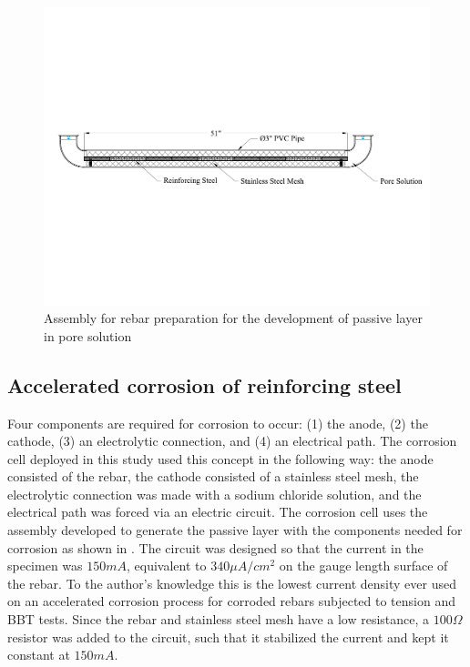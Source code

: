 \begin{figure}[htbp]
	\centering
	\includegraphics[width=1.0\textwidth]{Chapter-3/figs/AnodicPolarization_01}
	\caption{Assembly for rebar preparation for the development of passive layer in pore solution}
	\label{fig:RebarPassivation}
\end{figure}

\subsection{Accelerated corrosion  of reinforcing steel}

Four components are required for corrosion to occur: (1) the anode, (2) the cathode, (3) an electrolytic connection, and (4) an electrical path. The corrosion cell deployed in this study   used this concept in the following way:  the anode consisted of the rebar, the cathode consisted  of a stainless steel mesh, the electrolytic connection was made with a sodium chloride solution, and the electrical path was forced via an electric circuit. The corrosion cell uses the assembly developed to generate the passive layer with the components needed for corrosion as shown in . The circuit was  designed so that the current in the specimen was $150 mA$, equivalent to $340 \mu A/cm^2$ on the gauge length surface of the rebar. To the author's knowledge this is the lowest current density ever used on an accelerated corrosion process for corroded rebars subjected to tension and BBT tests. Since the rebar and stainless steel mesh have a low resistance, a $100 \Omega$ resistor was added to the circuit, such that it stabilized the current and kept it constant at $150mA$.

